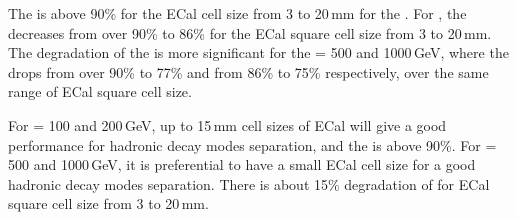 The \tauHad is above 90\% for the ECal cell size from 3 to 20\,mm for the . For , the \tauHad decreases from over 90\% to 86\% for the ECal square cell size from 3 to 20\,mm. The degradation of the \tauHad is more significant for the \sqrtS = 500 and 1000\,GeV, where the \tauHad drops from over 90\% to 77\%  and from 86\% to 75\% respectively, over the same range of ECal square cell size.

For \sqrtS = 100 and 200\,GeV, up to 15\,mm cell sizes of ECal will give a good performance for \Pgt hadronic decay modes separation, and the \tauHad is above 90\%. For \sqrtS = 500 and 1000\,GeV, it is preferential to have a small ECal cell size for a good \Pgt hadronic decay modes separation. There is about 15\% degradation of \tauHad for ECal square cell size from 3 to 20\,mm.

\section{} 